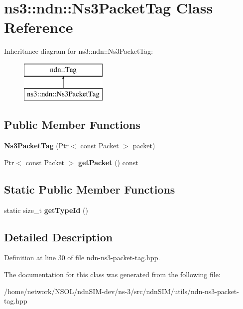\hypertarget{classns3_1_1ndn_1_1Ns3PacketTag}{}\section{ns3\+:\+:ndn\+:\+:Ns3\+Packet\+Tag Class Reference}
\label{classns3_1_1ndn_1_1Ns3PacketTag}
Inheritance diagram for ns3\+:\+:ndn\+:\+:Ns3\+Packet\+Tag\+:\begin{figure}[H]
\begin{center}
\leavevmode
\includegraphics[height=2.000000cm]{classns3_1_1ndn_1_1Ns3PacketTag}
\end{center}
\end{figure}
\subsection*{Public Member Functions}
\begin{DoxyCompactItemize}
\item 
{\bfseries Ns3\+Packet\+Tag} (Ptr$<$ const Packet $>$ packet)\hypertarget{classns3_1_1ndn_1_1Ns3PacketTag_a0135b9f6e8d6274ffed50cd2d14f0501}{}\label{classns3_1_1ndn_1_1Ns3PacketTag_a0135b9f6e8d6274ffed50cd2d14f0501}

\item 
Ptr$<$ const Packet $>$ {\bfseries get\+Packet} () const\hypertarget{classns3_1_1ndn_1_1Ns3PacketTag_ad55c3a51aeba5f87b317ceba72f1fd13}{}\label{classns3_1_1ndn_1_1Ns3PacketTag_ad55c3a51aeba5f87b317ceba72f1fd13}

\end{DoxyCompactItemize}
\subsection*{Static Public Member Functions}
\begin{DoxyCompactItemize}
\item 
static size\+\_\+t {\bfseries get\+Type\+Id} ()\hypertarget{classns3_1_1ndn_1_1Ns3PacketTag_a53f654d1887282f0bfd08b7b885ed475}{}\label{classns3_1_1ndn_1_1Ns3PacketTag_a53f654d1887282f0bfd08b7b885ed475}

\end{DoxyCompactItemize}


\subsection{Detailed Description}


Definition at line 30 of file ndn-\/ns3-\/packet-\/tag.\+hpp.



The documentation for this class was generated from the following file\+:\begin{DoxyCompactItemize}
\item 
/home/network/\+N\+S\+O\+L/ndn\+S\+I\+M-\/dev/ns-\/3/src/ndn\+S\+I\+M/utils/ndn-\/ns3-\/packet-\/tag.\+hpp\end{DoxyCompactItemize}
